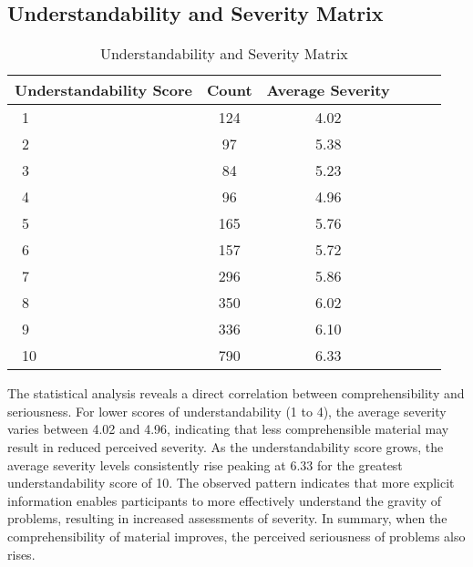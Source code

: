 \subsection{Understandability and Severity Matrix}

\begin{table*}[htb]
    \centering
    \begin{tabular}{@{}lc|cc|cc@{}}
     \textbf{Understandability Score} & \textbf{Count} &
     \textbf{Average Severity} 
     \\\hline
     \ 1 &124 &	4.02 
     \\\hline

     \ 2 & 97	 &5.38	  
     \\\hline
     
     \ 3 &  84	& 5.23	
     \\\hline
     
     \ 4 & 96 &	4.96  
     \\\hline
     
    \ 5 & 165 &	5.76
    \\\hline

    \ 6 & 157	& 5.72
    \\\hline

    \ 7 & 296 &	5.86
    \\\hline
    
    \ 8 & 350	&6.02
\\\hline
    \ 9 & 336	& 6.10
    \\\hline
     \ 10 & 790	&6.33
    \\\hline 
   
    \end{tabular}
    \caption{Understandability and Severity Matrix}
    \label{table:caseF1}
\end{table*}

The statistical analysis reveals a direct correlation between comprehensibility and seriousness. For lower scores of understandability (1 to 4), the average severity varies between 4.02 and 4.96, indicating that less comprehensible material may result in reduced perceived severity. As the understandability score grows, the average severity levels consistently rise peaking at 6.33 for the greatest understandability score of 10. The observed pattern indicates that more explicit information enables participants to more effectively understand the gravity of problems, resulting in increased assessments of severity. In summary, when the comprehensibility of material improves, the perceived seriousness of problems also rises.




